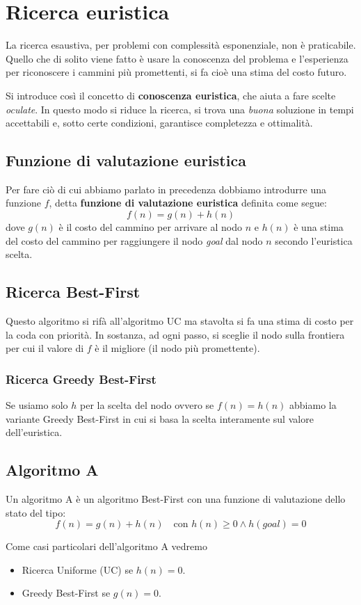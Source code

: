 \chapter{Ricerca euristica}
La ricerca esaustiva, per problemi con complessit\`a esponenziale, non \`e praticabile.
Quello che di solito viene fatto \`e usare la conoscenza del problema e l'esperienza
per riconoscere i cammini pi\`u promettenti, si fa cio\`e una stima del costo futuro.

Si introduce cos\`i il concetto di \textbf{conoscenza euristica}, che aiuta a fare scelte
\emph{oculate}. In questo modo si riduce la ricerca, si trova una \emph{buona} soluzione
in tempi accettabili e, sotto certe condizioni, garantisce completezza e ottimalit\`a.

\section{Funzione di valutazione euristica}
Per fare ci\`o di cui abbiamo parlato in precedenza dobbiamo introdurre una funzione
$f$, detta \textbf{funzione di valutazione euristica} definita come segue:
\[ f(n) = g(n) + h(n) \]
dove $g(n)$ \`e il costo del cammino per arrivare al nodo $n$ e $h(n)$ \`e una stima
del costo del cammino per raggiungere il nodo \emph{goal} dal nodo $n$ secondo l'euristica
scelta.

\section{Ricerca Best-First}
Questo algoritmo si rif\`a all'algoritmo UC ma stavolta si fa una stima di costo per
la coda con priorit\`a. In sostanza, ad ogni passo, si sceglie il nodo sulla frontiera
per cui il valore di $f$ \`e il migliore (il nodo pi\`u promettente).

\subsection{Ricerca Greedy Best-First}
Se usiamo solo $h$ per la scelta del nodo ovvero se $f(n) = h(n)$ abbiamo la variante
Greedy Best-First in cui si basa la scelta interamente sul valore dell'euristica.

\section{Algoritmo A}
\begin{definition}
	Un algoritmo A \`e un algoritmo Best-First con una funzione di valutazione dello
	stato del tipo:
	\[ f(n) = g(n) + h(n) \quad \text{con } h(n) \geq 0 \wedge h(goal) = 0 \]
\end{definition}
Come casi particolari dell'algoritmo A vedremo
\begin{itemize}
	\item Ricerca Uniforme (UC) se $h(n) = 0$.
	\item Greedy Best-First se $g(n) = 0$.
\end{itemize}

